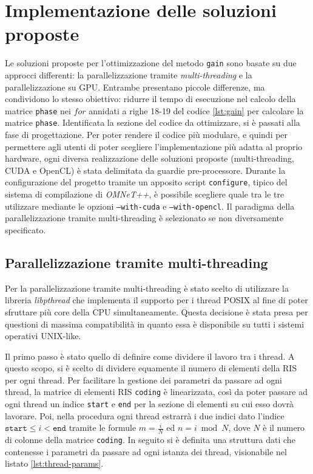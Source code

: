 \section{Implementazione delle soluzioni proposte}
\label{sec:implementazione}

Le soluzioni proposte per l'ottimizzazione del metodo \texttt{gain} sono basate
su due approcci differenti: la parallelizzazione tramite \textit{multi-threading}
e la parallelizzazione su GPU. Entrambe presentano piccole differenze, ma
condividono lo stesso obiettivo: ridurre il tempo di esecuzione nel calcolo della
matrice \texttt{phase} nei $for$ annidati a righe 18-19 del codice
\ref{lst:gain} per calcolare la matrice \texttt{phase}. Identificata la sezione
del codice da ottimizzare, si è passati alla fase di progettazione. Per poter
rendere il codice più modulare, e quindi per permettere agli utenti di poter scegliere
l'implementazione più adatta al proprio hardware, ogni diversa realizzazione
delle soluzioni proposte (multi-threading, CUDA e OpenCL) è stata delimitata da guardie
pre-processore. Durante la configurazione del progetto tramite un apposito
script \texttt{configure}, tipico del sistema di compilazione di \textit{OMNeT++},
è possibile scegliere quale tra le tre utilizzare mediante le opzioni \texttt{--with-cuda}
e \texttt{--with-opencl}. Il paradigma della parallelizzazione tramite multi-threading
è selezionato se non diversamente specificato.

\subsection{Parallelizzazione tramite multi-threading}
\label{subsec:multithreading}

Per la parallelizzazione tramite multi-threading è stato scelto di utilizzare la
libreria \textit{libpthread} che implementa il supporto per i thread POSIX al fine
di poter sfruttare più core della CPU simultaneamente. Questa decisione è stata
presa per questioni di massima compatibilità in quanto essa è disponibile su
tutti i sistemi operativi UNIX-like.

Il primo passo è stato quello di definire come dividere il lavoro tra i thread. A
questo scopo, si è scelto di dividere equamente il numero di elementi della RIS
per ogni thread. Per facilitare la gestione dei parametri da passare ad ogni thread,
la matrice di elementi RIS \texttt{coding} è linearizzata, così da poter passare
ad ogni thread un indice \texttt{start} e \texttt{end} per la sezione di
elementi su cui esso dovrà lavorare. Poi, nella procedura ogni thread estrarrà i
due indici dato l'indice $\texttt{start}\le i < \texttt{end}$ tramite le formule
$m = \frac{i}{N}$ ed $n = i \bmod N$, dove $N$ è il numero di colonne della matrice
\texttt{coding}. In seguito si è definita una struttura dati che contenesse i parametri
da passare ad ogni istanza dei thread, visionabile nel listato
\ref{lst:thread-params}.

